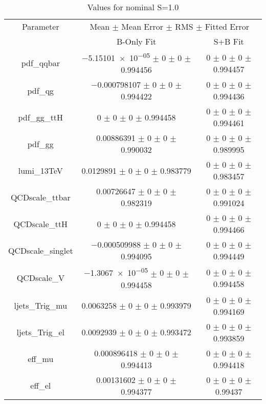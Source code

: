 \begin{table}
\centering
\caption{Values for nominal S=1.0}
\begin{tabular}{ccc}
\toprule
Parameter & \multicolumn{2}{c}{Mean $\pm$ Mean Error $\pm$ RMS $\pm$ Fitted Error}\\
 & B-Only Fit & S+B Fit\\
\midrule
pdf\_qqbar & \num{-5.15101e-05} $\pm$ \num{0} $\pm$ \num{0} $\pm$ \num{0.994456} & \num{0} $\pm$ \num{0} $\pm$ \num{0} $\pm$ \num{0.994457}\\
pdf\_qg & \num{-0.000798107} $\pm$ \num{0} $\pm$ \num{0} $\pm$ \num{0.994422} & \num{0} $\pm$ \num{0} $\pm$ \num{0} $\pm$ \num{0.994436}\\
pdf\_gg\_ttH & \num{0} $\pm$ \num{0} $\pm$ \num{0} $\pm$ \num{0.994458} & \num{0} $\pm$ \num{0} $\pm$ \num{0} $\pm$ \num{0.994461}\\
pdf\_gg & \num{0.00886391} $\pm$ \num{0} $\pm$ \num{0} $\pm$ \num{0.990032} & \num{0} $\pm$ \num{0} $\pm$ \num{0} $\pm$ \num{0.989995}\\
lumi\_13TeV & \num{0.0129891} $\pm$ \num{0} $\pm$ \num{0} $\pm$ \num{0.983779} & \num{0} $\pm$ \num{0} $\pm$ \num{0} $\pm$ \num{0.983457}\\
QCDscale\_ttbar & \num{0.00726647} $\pm$ \num{0} $\pm$ \num{0} $\pm$ \num{0.982319} & \num{0} $\pm$ \num{0} $\pm$ \num{0} $\pm$ \num{0.991024}\\
QCDscale\_ttH & \num{0} $\pm$ \num{0} $\pm$ \num{0} $\pm$ \num{0.994458} & \num{0} $\pm$ \num{0} $\pm$ \num{0} $\pm$ \num{0.994466}\\
QCDscale\_singlet & \num{-0.000509988} $\pm$ \num{0} $\pm$ \num{0} $\pm$ \num{0.994095} & \num{0} $\pm$ \num{0} $\pm$ \num{0} $\pm$ \num{0.994449}\\
QCDscale\_V & \num{-1.3067e-05} $\pm$ \num{0} $\pm$ \num{0} $\pm$ \num{0.994458} & \num{0} $\pm$ \num{0} $\pm$ \num{0} $\pm$ \num{0.994458}\\
ljets\_Trig\_mu & \num{0.0063258} $\pm$ \num{0} $\pm$ \num{0} $\pm$ \num{0.993979} & \num{0} $\pm$ \num{0} $\pm$ \num{0} $\pm$ \num{0.994169}\\
ljets\_Trig\_el & \num{0.0092939} $\pm$ \num{0} $\pm$ \num{0} $\pm$ \num{0.993472} & \num{0} $\pm$ \num{0} $\pm$ \num{0} $\pm$ \num{0.993859}\\
eff\_mu & \num{0.000896418} $\pm$ \num{0} $\pm$ \num{0} $\pm$ \num{0.994413} & \num{0} $\pm$ \num{0} $\pm$ \num{0} $\pm$ \num{0.994418}\\
eff\_el & \num{0.00131602} $\pm$ \num{0} $\pm$ \num{0} $\pm$ \num{0.994377} & \num{0} $\pm$ \num{0} $\pm$ \num{0} $\pm$ \num{0.99437}\\

\end{tabular}
\end{table}
